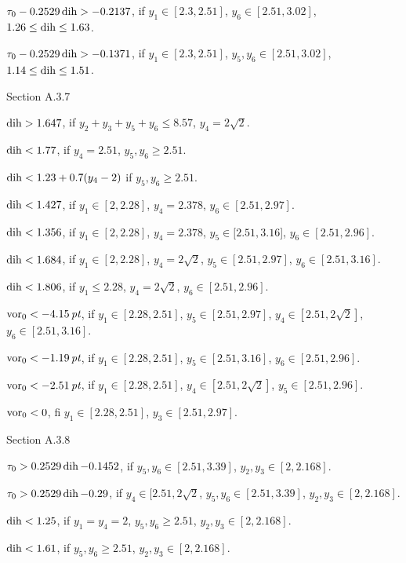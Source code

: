 $\tau_0- 0.2529\operatorname{dih} > -0.2137$,
	if $y_1\in[2.3,2.51]$, $y_6\in[2.51,3.02]$, $1.26\le\operatorname{dih}\le 1.63$.

$\tau_0 - 0.2529\operatorname{dih} > -0.1371$,
	if $y_1\in[2.3,2.51]$, $y_5,y_6\in[2.51,3.02]$,
	$1.14\le\operatorname{dih}\le 1.51$.

\subhead Section A.3.7\endsubhead

$\operatorname{dih}>1.647$, if $y_2+y_3+y_5+y_6\le 8.57$, $y_4=2\sqrt2$.

$\operatorname{dih}<1.77$, if $y_4=2.51$, $y_5,y_6\ge2.51$.

$\operatorname{dih}< 1.23 + 0.7(y_4-2)$ if $y_5,y_6\ge 2.51$.

$\operatorname{dih}< 1.427$, if $y_1\in[2,2.28]$, $y_4=2.378$, $y_6\in[2.51,2.97]$.

$\operatorname{dih}< 1.356$, if $y_1\in[2,2.28]$, $y_4=2.378$, $y_5\in[2.51,3.16$],
		$y_6\in[2.51,2.96]$.

$\operatorname{dih}<1.684$, if $y_1\in[2,2.28]$, $y_4=2\sqrt2$,
	$y_5\in[2.51,2.97]$, $y_6\in[2.51,3.16]$.

$\operatorname{dih}<1.806$, if $y_1\le2.28$, $y_4=2\sqrt2$, $y_6\in[2.51,2.96]$.

$\operatorname{vor}_0 < -4.15\,\hbox{\it pt}$, if $y_1\in[2.28,2.51]$,
	$y_5\in[2.51,2.97]$, $y_4\in[2.51,2\sqrt2]$, $y_6\in[2.51,3.16]$.

$\operatorname{vor}_0< -1.19\,\hbox{\it pt}$, if $y_1\in[2.28,2.51]$, $y_5\in[2.51,3.16]$,
	$y_6\in[2.51,2.96]$.

$\operatorname{vor}_0 < -2.51\,\hbox{\it pt}$, if $y_1\in[2.28,2.51]$, $y_4\in[2.51,2\sqrt2]$,
		$y_5\in[2.51,2.96]$.

$\operatorname{vor}_0 < 0$, fi $y_1\in[2.28,2.51]$, $y_3\in[2.51,2.97]$.







\subhead Section A.3.8\endsubhead

$\tau_0 > 0.2529\operatorname{dih} - 0.1452$, if $y_5,y_6\in[2.51,3.39]$,
		$y_2,y_3\in[2,2.168]$.

$\tau_0 > 0.2529\operatorname{dih} - 0.29$, if $y_4\in[2.51,2\sqrt2$,
	$y_5,y_6\in[2.51,3.39]$, $y_2,y_3\in[2,2.168]$.

$\operatorname{dih}<1.25$, if $y_1=y_4=2$, $y_5,y_6\ge 2.51$, $y_2,y_3\in[2,2.168]$.

$\operatorname{dih}< 1.61$, if $y_5,y_6\ge 2.51$, $y_2,y_3\in[2,2.168]$.

